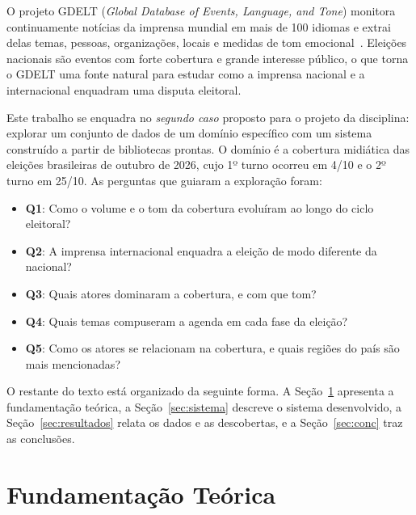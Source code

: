 \documentclass[conference]{IEEEtran}
\begin{document}
O projeto GDELT (\emph{Global Database of Events, Language, and Tone}) monitora continuamente notícias da imprensa mundial em mais de 100 idiomas e extrai delas temas, pessoas, organizações, locais e medidas de tom emocional~\cite{leetaru2013}. Eleições nacionais são eventos com forte cobertura e grande interesse público, o que torna o GDELT uma fonte natural para estudar como a imprensa nacional e a internacional enquadram uma disputa eleitoral.

Este trabalho se enquadra no \emph{segundo caso} proposto para o projeto da disciplina: explorar um conjunto de dados de um domínio específico com um sistema construído a partir de bibliotecas prontas. O domínio é a cobertura midiática das eleições brasileiras de outubro de 2026, cujo 1º turno ocorreu em 4/10 e o 2º turno em 25/10. As perguntas que guiaram a exploração foram:
\begin{itemize}
  \item \textbf{Q1}: Como o volume e o tom da cobertura evoluíram ao longo do ciclo eleitoral?
  \item \textbf{Q2}: A imprensa internacional enquadra a eleição de modo diferente da nacional?
  \item \textbf{Q3}: Quais atores dominaram a cobertura, e com que tom?
  \item \textbf{Q4}: Quais temas compuseram a agenda em cada fase da eleição?
  \item \textbf{Q5}: Como os atores se relacionam na cobertura, e quais regiões do país são mais mencionadas?
\end{itemize}

O restante do texto está organizado da seguinte forma. A Seção~\ref{sec:fund} apresenta a fundamentação teórica, a Seção~\ref{sec:sistema} descreve o sistema desenvolvido, a Seção~\ref{sec:resultados} relata os dados e as descobertas, e a Seção~\ref{sec:conc} traz as conclusões.

\section{Fundamentação Teórica}\label{sec:fund}
\end{document}
